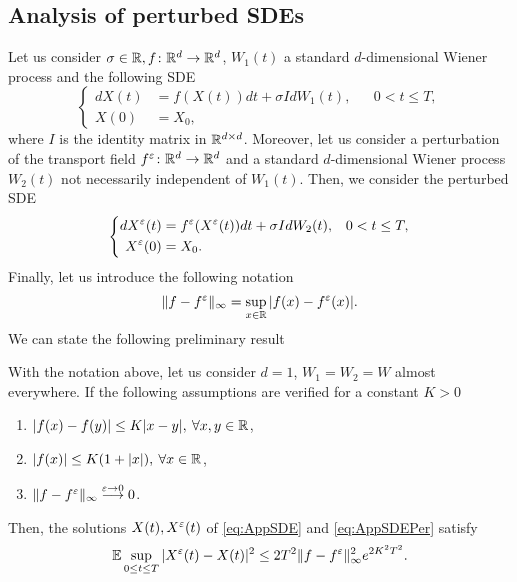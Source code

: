 \subsection{Analysis of perturbed SDEs}
Let us consider $\sigma \in \mathbb{R}, f\colon \mathbb{R}^d \rightarrow \mathbb{R}^d$, $W_1(t)$ a standard $d$-dimensional Wiener process and the following SDE
\begin{equation}\label{eq:AppSDE}
\left \{
\begin{aligned}
	dX(t) &= f(X(t))dt + \sigma IdW_1(t), && 0 < t \leq T, \\
	X(0) &= X_0,
\end{aligned} \right .
\end{equation}
where $I$ is the identity matrix in $\mathbb{R}^{d\times d}$. Moreover, let us consider a perturbation of the transport field $f^\varepsilon\colon \mathbb{R}^d \rightarrow \mathbb{R}^d$ and a standard $d$-dimensional Wiener process $W_2(t)$ not necessarily independent of $W_1(t)$. Then, we consider the perturbed SDE 
\begin{equation}\label{eq:AppSDEPer}
\left \{
\begin{aligned}
	dX^\varepsilon(t) &= f^\varepsilon(X^\varepsilon(t))dt + \sigma I dW_2(t), && 0 < t \leq T, \\
	X^\varepsilon(0) &= X_0.
\end{aligned} \right .
\end{equation}
Finally, let us introduce the following notation
\begin{equation*}
	\|f - f^\varepsilon\|_{\infty} = \sup_{x\in \mathbb{R}} |f(x) - f^\varepsilon(x)|.
\end{equation*}
We can state the following preliminary result
\begin{lemma}\label{lem:Lemma1} With the notation above, let us consider $d = 1$, $W_1 = W_2 = W$ almost everywhere. If the following assumptions are verified for a constant $K > 0$
\begin{enumerate}
	\item $|f(x) - f(y)| \leq K|x - y|, \: \forall x,y \in \mathbb{R}$,
	\item $|f(x)| \leq K(1 + |x|), \: \forall x \in \mathbb{R}$,
 	\item $\|f - f^\varepsilon\|_{\infty} \stackrel{\varepsilon \rightarrow 0}\longrightarrow 0$.
\end{enumerate}
Then, the solutions $X(t), X^\varepsilon(t)$ of \ref{eq:AppSDE} and \ref{eq:AppSDEPer} satisfy
\begin{equation*}
	\mathbb{E} \sup_{0 \leq t \leq T} |X^\varepsilon(t) - X(t)|^2 \leq  2T^2 \|f - f^\varepsilon\|_{\infty}^2 e^{2K^2T^2}.
\end{equation*}
\end{lemma}

